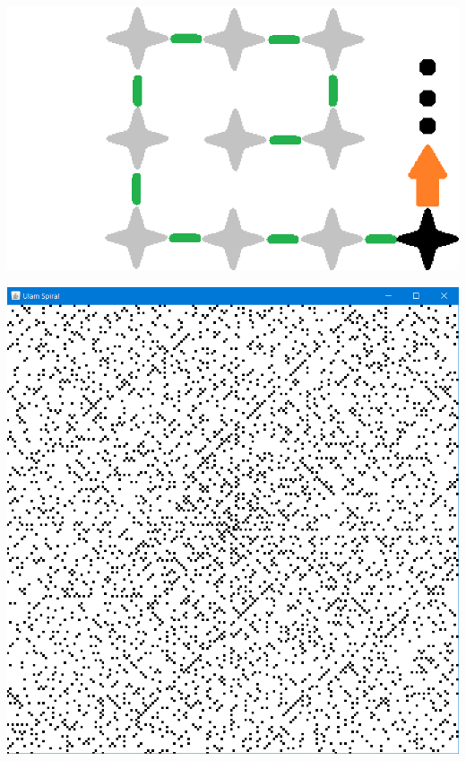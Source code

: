 \documentclass{beamer}
\begin{document}
\begin{frame}
\begin{center}
\includegraphics[scale=0.5]{images/s7.PNG}
\end{center}
\end{frame}

\begin{frame}
\begin{center}
\includegraphics[scale=0.35]{images/spirale_1.PNG}
\end{center}
\end{frame}
\end{document}

